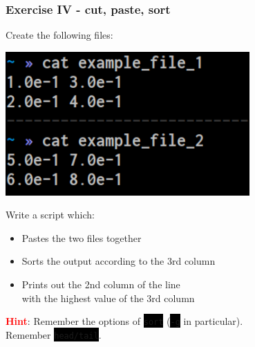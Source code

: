 \documentclass[unknownkeysallowed, 10pt, a4 paper, handout]{beamer}
\newcommand{\focus}[1]{\textbf{\textcolor{red}{#1}}}
\newcommand{\code}[1]{\colorbox{black}{\color{green}\texttt{#1}}}
\newcommand{\sidebyside}[5]{
  \begin{minipage}{#1\textwidth}
    #2
  \end{minipage} #3 \begin{minipage}{#4\textwidth}
    #5
  \end{minipage}
}
\begin{document}
\begin{frame}
  \begin{center}
    \frametitle{Exercise IV - cut, paste, sort}

    \sidebyside{0.35}{
      Create the following files:
    }{\hfill}{0.60}{
      \begin{center}
        \includegraphics[width=0.70\textwidth]{pics/ex_4.png}
      \end{center}
    }

    \vspace{3mm}

    Write a script which:

    \begin{itemize}
      \item Pastes the two files together
      \item Sorts the output according to the 3rd column
      \item Prints out the 2nd column of the line\\
        with the highest value of the 3rd column
    \end{itemize}

    \vspace{3mm}

    \focus{Hint}: Remember the options of \code{sort} (\code{-g} in
    particular).\\
    Remember \code{head/tail}.
  \end{center}
\end{frame}
\end{document}
